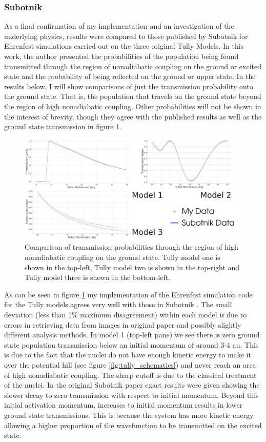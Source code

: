 \subsubsection{Subotnik}
As a final confirmation of my implementation and an investigation of the underlying physics, results were compared to those published by Subotnik \cite{SubotnikMomentumEhrenfest} for Ehrenfest simulations carried out on the three original Tully Models. In this work, the author presented the probabilities of the population being found transmitted through the region of nonadiabatic coupling on the ground or excited state and the probability of being reflected on the ground or upper state. In the results below, I will show comparisons of just the transmission probability onto the ground state. That is, the population that travels on the ground state beyond the region of high nonadiabatic coupling. Other probabilities will not be shown in the interest of brevity, though they agree with the published results as well as the ground state transmission in figure \ref{fig:SubotnikComparison}.
\begin{figure}[ht]
  \includegraphics[width=\textwidth]{../img/CTMQC/TullyModels/Ehrenfest_vs_Subotnik.png}
  \caption{\label{fig:SubotnikComparison}Comparison of transmission probabilities through the region of high nonadiabatic coupling on the ground state. Tully model one is shown in the top-left, Tully model two is shown in the top-right and Tully model three is shown in the bottom-left.}
\end{figure}
As can  be seen in figure \ref{fig:SubotnikComparison} my implementation of the Ehrenfest simulation code for the Tully models agrees very well with those in Subotnik \cite{SubotnikMomentumEhrenfest}. The small deviation (less than 1\% maximum disagreement) within each model is due to errors in retrieving data from images in original paper and possibly slightly different analysis methods. In model 1 (top-left pane) we see there is zero ground state population transmission below an initial momentum of around 3-4 au. This is due to the fact that the nuclei do not have enough kinetic energy to make it over the potential hill (see figure \ref{fig:tully_schematics}) and never reach an area of high nonadiabatic coupling. The sharp cutoff is due to the classical treatment of the nuclei. In the original Subotnik \cite{SubotnikMomentumEhrenfest} paper exact results were given showing the slower decay to zero transmission with respect to initial momentum. Beyond this initial activation momentum, increases to initial momentum results in lower ground state transmissions. This is because the system has more kinetic energy allowing a higher proportion of the wavefunction to be transmitted on the excited state.
